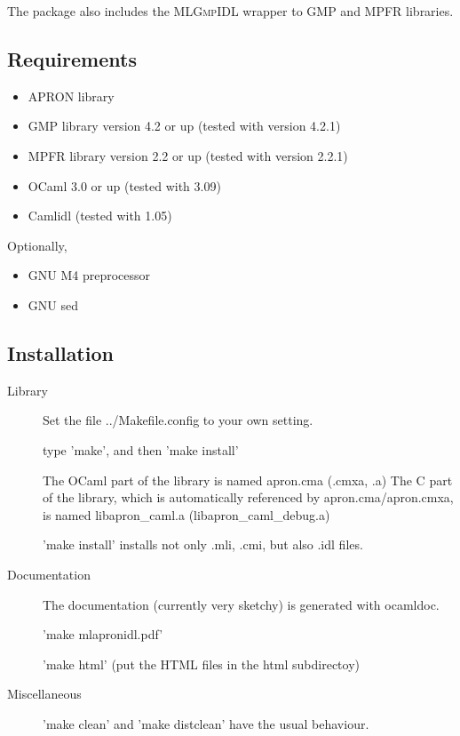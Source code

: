 \documentclass[twoside,10pt,a4paper]{report}
\begin{document}
The package also includes the \textsc{MLGmpIDL} wrapper to GMP and
MPFR libraries.

\subsection*{Requirements}

\begin{itemize}
\item APRON library
\item GMP library version 4.2 or up (tested with version 4.2.1)
\item MPFR library version 2.2 or up (tested with version 2.2.1)
\item OCaml 3.0 or up (tested with 3.09)
\item Camlidl (tested with 1.05)
\end{itemize}

Optionally,
\begin{itemize}
\item GNU M4 preprocessor
\item GNU sed
\end{itemize}

\subsection*{Installation}

\begin{description}
\item[Library]
Set the file ../Makefile.config to your own setting.

type 'make', and then 'make install'

The OCaml part of the library is named apron.cma (.cmxa, .a) The C
part of the library, which is automatically referenced by
apron.cma/apron.cmxa, is named libapron\_caml.a
(libapron\_caml\_debug.a)

'make install' installs not only .mli, .cmi, but also .idl files.
\item[Documentation]
The documentation (currently very sketchy) is generated with ocamldoc.

'make mlapronidl.pdf'

'make html' (put the HTML files in the html subdirectoy)

\item[Miscellaneous]
'make clean' and 'make distclean' have the usual behaviour.
\end{description}
\end{document}
